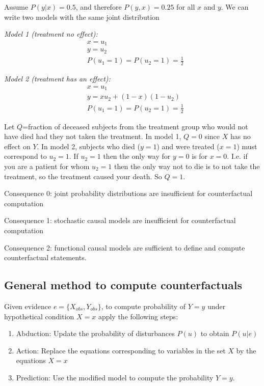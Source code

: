 \documentclass[11pt]{article}
\numberwithin{equation}{section}
\begin{document}
Assume $P(y|x) = 0.5$, and therefore $P(y,x)=0.25$ for all $x$ and $y$. We can write two models with the same joint distribution

\textit{Model 1 (treatment no effect):}
\begin{align}
&x=u_1\\
&y=u_2\\
&P(u_1=1) = P(u_2=1)= \frac{1}{2}
\end{align}


\textit{Model 2 (treatment has an effect):}
\begin{align}
&x=u_1\\
&y=xu_2 + (1-x)(1-u_2)\\
&P(u_1=1) = P(u_2=1)= \frac{1}{2}
\end{align}

Let $Q$=fraction of deceased subjects from the treatment group who would not have died had they not taken the treatment. In model 1, $Q=0$ since $X$ has no effect on $Y$. In model 2, subjects who died ($y=1$) and were treated ($x=1$) must correspond to $u_2=1$. If $u_2=1$ then the only way for $y=0$ is for $x=0$. I.e. if you are a patient for whom $u_2=1$ then the only way not to die is to not take the treatment, so the treatment caused your death. So $Q=1$.

Consequence 0: joint probability distributions are insufficient for counterfactual computation

Consequence 1: stochastic causal models are insufficient for counterfactual computation

Consequence 2: functional causal models are sufficient to define and compute counterfactual statements.

\subsection{General method to compute counterfactuals}
Given evidence $e=\{X_{obs}, Y_{obs}\}$, to compute probability of $Y=y$ under hypothetical condition $X=x$ apply the following steps:
\begin{enumerate}[noitemsep]
\item Abduction: Update the probability of disturbances $P(u)$ to obtain $P(u|e)$
\item Action: Replace the equations corresponding to variables in the set $X$ by the equations $X=x$
\item Prediction: Use the modified model to compute the probability $Y=y$.
\end{enumerate}
\end{document}
